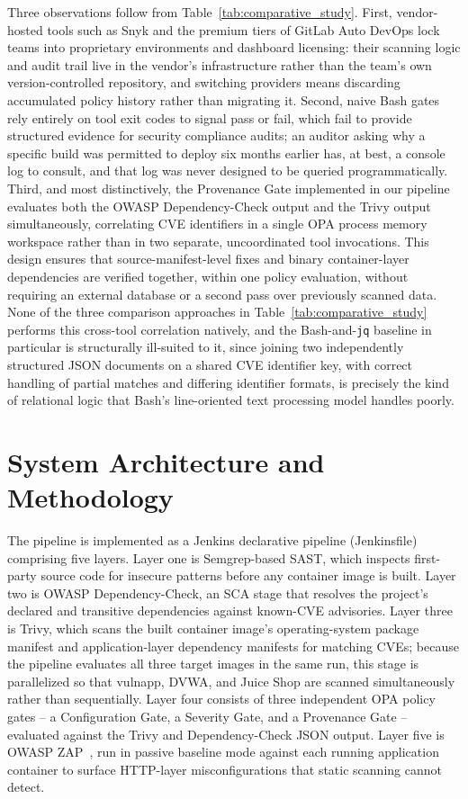 \documentclass[conference]{IEEEtran}
\begin{document}
Three observations follow from Table~\ref{tab:comparative_study}. First, vendor-hosted tools such as Snyk and the premium tiers of GitLab Auto DevOps lock teams into proprietary environments and dashboard licensing: their scanning logic and audit trail live in the vendor's infrastructure rather than the team's own version-controlled repository, and switching providers means discarding accumulated policy history rather than migrating it. Second, naive Bash gates rely entirely on tool exit codes to signal pass or fail, which fail to provide structured evidence for security compliance audits; an auditor asking why a specific build was permitted to deploy six months earlier has, at best, a console log to consult, and that log was never designed to be queried programmatically. Third, and most distinctively, the Provenance Gate implemented in our pipeline evaluates both the OWASP Dependency-Check output and the Trivy output simultaneously, correlating CVE identifiers in a single OPA process memory workspace rather than in two separate, uncoordinated tool invocations. This design ensures that source-manifest-level fixes and binary container-layer dependencies are verified together, within one policy evaluation, without requiring an external database or a second pass over previously scanned data. None of the three comparison approaches in Table~\ref{tab:comparative_study} performs this cross-tool correlation natively, and the Bash-and-\texttt{jq} baseline in particular is structurally ill-suited to it, since joining two independently structured JSON documents on a shared CVE identifier key, with correct handling of partial matches and differing identifier formats, is precisely the kind of relational logic that Bash's line-oriented text processing model handles poorly.

\section{System Architecture and Methodology}
\label{sec:arch}

The pipeline is implemented as a Jenkins declarative pipeline (Jenkinsfile) comprising five layers. Layer one is Semgrep-based SAST, which inspects first-party source code for insecure patterns before any container image is built. Layer two is OWASP Dependency-Check, an SCA stage that resolves the project's declared and transitive dependencies against known-CVE advisories. Layer three is Trivy, which scans the built container image's operating-system package manifest and application-layer dependency manifests for matching CVEs; because the pipeline evaluates all three target images in the same run, this stage is parallelized so that vulnapp, DVWA, and Juice Shop are scanned simultaneously rather than sequentially. Layer four consists of three independent OPA policy gates -- a Configuration Gate, a Severity Gate, and a Provenance Gate -- evaluated against the Trivy and Dependency-Check JSON output. Layer five is OWASP ZAP~\cite{ref8}, run in passive baseline mode against each running application container to surface HTTP-layer misconfigurations that static scanning cannot detect.
\end{document}
